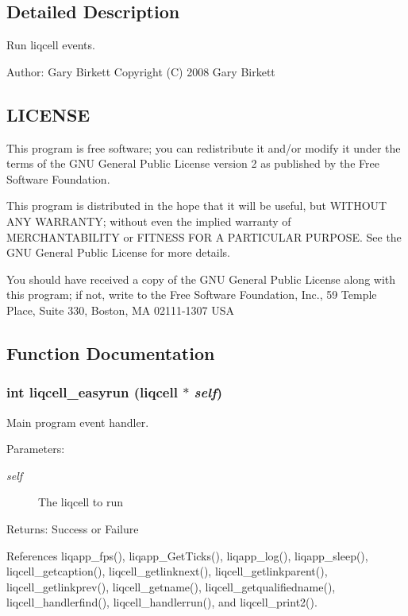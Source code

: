 \label{_details}
\subsection{Detailed Description}
Run liqcell events. 

\begin{Desc}
\item[Author:]Gary Birkett Copyright (C) 2008 Gary Birkett\end{Desc}
\subsection{LICENSE}\label{de/d77/liqui_8c_LICENSE}
This program is free software; you can redistribute it and/or modify it under the terms of the GNU General Public License version 2 as published by the Free Software Foundation.

This program is distributed in the hope that it will be useful, but WITHOUT ANY WARRANTY; without even the implied warranty of MERCHANTABILITY or FITNESS FOR A PARTICULAR PURPOSE. See the GNU General Public License for more details.

You should have received a copy of the GNU General Public License along with this program; if not, write to the Free Software Foundation, Inc., 59 Temple Place, Suite 330, Boston, MA 02111-1307 USA 

\subsection{Function Documentation}
\subsubsection[{liqcell\_\-easyrun}]{\setlength{\rightskip}{0pt plus 5cm}int liqcell\_\-easyrun (liqcell $\ast$ {\em self})}\label{d5/d54/liqcell__easyrun_8c_188e60421511aac91bdf91a796c0718f}


Main program event handler. \begin{Desc}
\item[Parameters:]
\begin{description}
\item[{\em self}]The liqcell to run \end{description}
\end{Desc}
\begin{Desc}
\item[Returns:]Success or Failure \end{Desc}


References liqapp\_\-fps(), liqapp\_\-GetTicks(), liqapp\_\-log(), liqapp\_\-sleep(), liqcell\_\-getcaption(), liqcell\_\-getlinknext(), liqcell\_\-getlinkparent(), liqcell\_\-getlinkprev(), liqcell\_\-getname(), liqcell\_\-getqualifiedname(), liqcell\_\-handlerfind(), liqcell\_\-handlerrun(), and liqcell\_\-print2().